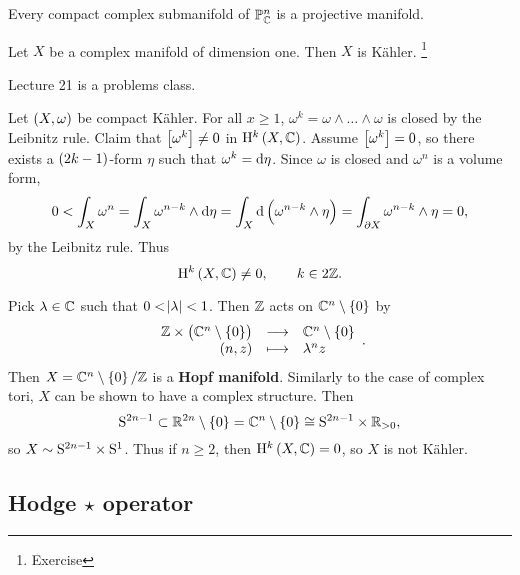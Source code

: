 \begin{fact*}
Every compact complex submanifold of $ \PP_\CC^n $ is a projective manifold.
\end{fact*}

\begin{example*}
Let $ X $ be a complex manifold of dimension one. Then $ X $ is K\"ahler. \footnote{Exercise}
\end{example*}


Lecture 21 is a problems class.

\pagebreak


Let $ \br{X, \omega} $ be compact K\"ahler. For all $ x \ge 1 $, $ \omega^k = \omega \wedge \dots \wedge \omega $ is closed by the Leibnitz rule. Claim that $ \sbr{\omega^k} \ne 0 $ in $ \H^k\br{X, \CC} $. Assume $ \sbr{\omega^k} = 0 $, so there exists a $ \br{2k - 1} $-form $ \eta $ such that $ \omega^k = \d\eta $. Since $ \omega $ is closed and $ \omega^n $ is a volume form,
$$ 0 < \int_X \omega^n = \int_X \omega^{n - k} \wedge \d\eta = \int_X \d\br{\omega^{n - k} \wedge \eta} = \int_{\da X} \omega^{n - k} \wedge \eta = 0, $$
by the Leibnitz rule. Thus
$$ \H^k\br{X, \CC} \ne 0, \qquad k \in 2\ZZ. $$

\begin{example}
Pick $ \lambda \in \CC $ such that $ 0 < \abs{\lambda} < 1 $. Then $ \ZZ $ acts on $ \CC^n \setminus \cbr{0} $ by
$$ \function{\ZZ \times \br{\CC^n \setminus \cbr{0}}}{\CC^n \setminus \cbr{0}}{\br{n, z}}{\lambda^nz}. $$
Then $ X = \CC^n \setminus \cbr{0} / \ZZ $ is a \textbf{Hopf manifold}. Similarly to the case of complex tori, $ X $ can be shown to have a complex structure. Then
$$ \S^{2n - 1} \subset \RR^{2n} \setminus \cbr{0} = \CC^n \setminus \cbr{0} \cong \S^{2n - 1} \times \RR_{> 0}, $$
so $ X \sim \S^{2n - 1} \times \S^1 $. Thus if $ n \ge 2 $, then $ \H^k\br{X, \CC} = 0 $, so $ X $ is not K\"ahler.
\end{example}

\subsection{Hodge \texorpdfstring{$ \star $}{*} operator}

